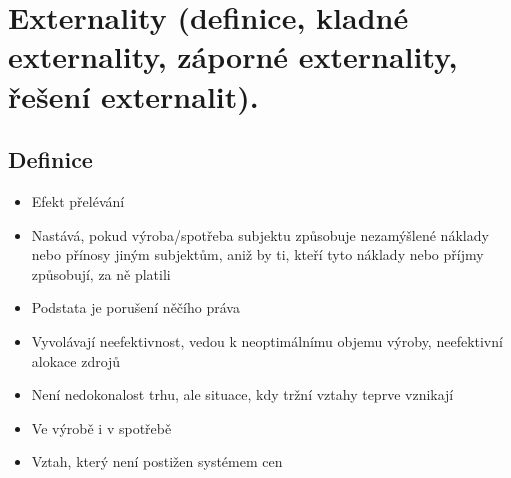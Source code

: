 \clearpage
\section{Externality (definice, kladné externality, záporné externality, řešení externalit).}
\subsection{Definice}
\begin{itemize}
    \item Efekt přelévání
    \item Nastává, pokud výroba/spotřeba subjektu způsobuje nezamýšlené náklady nebo přínosy jiným subjektům, 
    aniž by ti, kteří tyto náklady nebo příjmy způsobují, za ně platili
    \item Podstata je porušení něčího práva
    \item Vyvolávají neefektivnost, vedou k neoptimálnímu objemu výroby, neefektivní alokace zdrojů
    \item Není nedokonalost trhu, ale situace, kdy tržní vztahy teprve vznikají
    \item Ve výrobě i v spotřebě
    \item Vztah, který není postižen systémem cen
\end{itemize}

